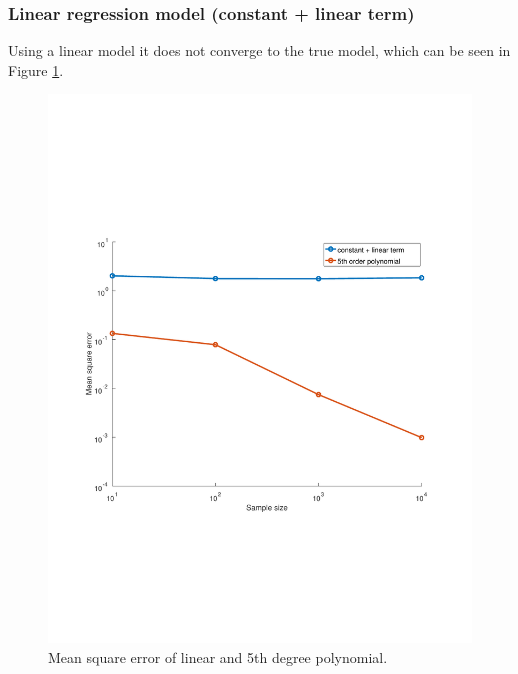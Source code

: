 \documentclass[]{article}
\begin{document}
\subsubsection{Linear regression model (constant + linear term)}
Using a linear model it does not converge to the true model, which can be seen in Figure \ref{fig:proj1-3_2a-mse}.
\begin{figure}[ht]
	\centering
	\includegraphics[trim= 10cm 5cm 10cm 5cm, scale=0.4]{proj1-3_2a-mse}
	\caption{Mean square error of linear and 5th degree polynomial.}
	\label{fig:proj1-3_2a-mse}
\end{figure}
\end{document}
